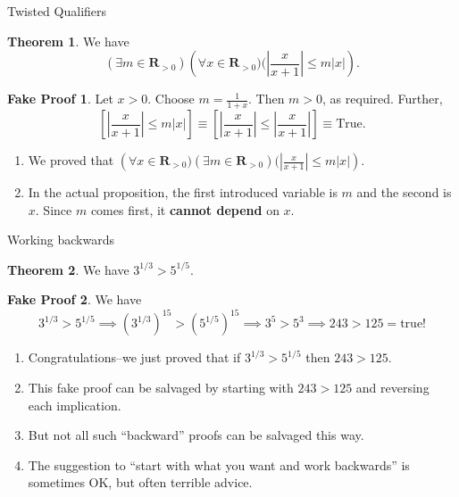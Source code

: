 \documentclass[fleqn]{beamer}
\newcommand{\reals}{\mathbf{R}}
\theoremstyle{definition}
\newtheorem{myth}{Theorem}
\newtheorem{myfakeproof}{Fake Proof}
\begin{document}
\begin{frame}{Twisted Qualifiers}

\begin{myth}  We have
\[
   \left (\exists m \in \reals_{> 0} \right) \left (\forall x \in  \reals_{> 0}) (\left| \frac{x}{x+1} \right| \leq m |x| \right).
\]
\end{myth}
\begin{myfakeproof}    Let \(x > 0\).  Choose \(m = \frac{1}{1+x}\).  Then \(m > 0\), as required. Further,
\[
   \left [ | \frac{x}{x+1} | \leq m |x| \right] \equiv  \left [\left| \frac{x}{x+1} \right| \leq \left| \frac{x}{x+1} \right| \right] \equiv \mbox{True}.
\]
\end{myfakeproof}
\begin{enumerate}

\item We proved that  \( \left (\forall x \in  \reals_{> 0}) \left (\exists m \in \reals_{> 0} \right)  (\left| \frac{x}{x+1} \right| \leq m |x| \right) \).

\item In the actual proposition, the first introduced variable is \(m\) and the second is \(x\).  Since \(m\) comes first, it \textbf{cannot depend} on \(x\).

\end{enumerate}

\end{frame}
\begin{frame}{Working backwards}

\begin{myth} We have \(3^{1/3} > 5^{1/5} \). \end{myth}

\begin{myfakeproof}
We have
\small
\[
   3^{1/3} > 5^{1/5} \implies (3^{1/3})^{15} > (5^{1/5})^{15} \implies 3^5> 5^3 \implies 243 > 125  =  \mathrm{true!}
\]
\end{myfakeproof}

\begin{enumerate}
\item Congratulations--we just proved that if  \(3^{1/3} > 5^{1/5}\) then \( 243 > 125\).

\item This fake proof can be salvaged by starting with \( 243 > 125\) and reversing each implication.

\item But not all such ``backward'' proofs can be salvaged this way.

\item The  suggestion to ``start with what you want and work backwards'' is sometimes OK, but  often terrible advice.
\end{enumerate}
\end{frame}
\end{document}

